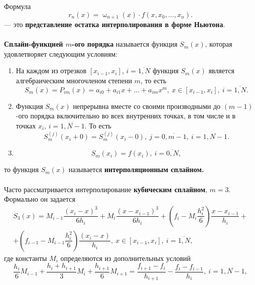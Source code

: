 \documentclass[a4paper, 12pt]{report}
\numberwithin{equation}{section}
\renewcommand{\omega}{\upomega}
\begin{document}
	Формула \begin{equation}
		r_n(x) = \omega_{n+1}(x)\cdot f(x,x_0,\ldots, x_n).
	\end{equation} --- это \textbf{представление остатка интерполирования в форме Ньютона}.
	\\\\
	\textbf{Сплайн-функцией $m$-ого порядка} называется функция $S_m(x)$, которая удовлетворяет следующим условиям:
	\begin{enumerate}
		\item {На каждом из отрезков $[x_{i-1}, x_i]$, $i=\overline{1,N}$ функция $S_m(x)$ является алгебраическим многочленом степени $m$, то есть} \begin{equation}
			S_m(x) = P_{im}(x) = a_{i0} + a_{i1}x + \ldots + a_{im}x^m,\ x\in [x_{i-1}, x_i],\ i=\overline{1,N}.
		\end{equation}
		\item {Функция $S_m(x)$ непрерывна вместе со своими производными до $(m-1)$-ого порядка включительно во всех внутренних точках, в том числе и в точках $x_i$, $i=\overline{1,N-1}$. То есть} \begin{equation}
			S_m^{(j)}(x_i+0) = S_m^{(j)}(x_i-0),\ j=\overline{0, m-1}, \ i=\overline{1, N-1}.
		\end{equation}
		\item
		\begin{equation}
			S_m(x_i) = f(x_i),\ i=\overline{0,N},
		\end{equation}
	\end{enumerate}
	то функция $S_m(x)$ называется \textbf{интерполяционным сплайном.}\\\\
	Часто рассматривается интерполирование \textbf{кубическим сплайном}, $m=3$.
	Формально он задается 
	\begin{multline}
		S_3(x) = M_{i-1}\dfrac{(x_i - x)^3}{6h_i} + M_{i}\dfrac{(x-x_{i-1})^3}{6h_i} + \left(f_i - M_i\dfrac{h_i^2}{6}\right)\dfrac{x-x_{i-1}}{h_i} +\\+ \left(f_{i-1} - M_{i-1}\dfrac{h_i^2}{6}\right)\dfrac{(x_i - x)}{h_i},\ x\in [x_{i-1}, x_i],\ i = \overline{1,N},
	\end{multline}
	где константы $M_i$ определяются из дополнительных условий
	\begin{equation}
		\dfrac{h_i}{6}M_{i-1} + \dfrac{h_i + h_{i+1}}{3}M_i + \dfrac{h_{i+1}}{6}M_{i+1} = \dfrac{f_{i+1} - f_i}{h_{i+1}} - \dfrac{f_i - f_{i-1}}{h_i},\ i = \overline {1,N-1},
	\end{equation}
\end{document}
